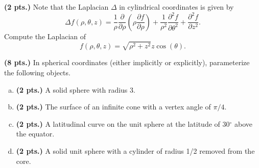 \documentclass[12pt]{article} %
\begin{document}
\vspace*{.5cm}

\begin{problem}
	\textbf{(2 pts.)} Note that the Laplacian $\Delta$ in cylindrical coordinates is given by
	\[
	\Delta f(\rho,\theta,z) = \frac{1}{\rho} \frac{\partial}{\partial \rho} \left(\rho \frac{\partial f}{\partial \rho}\right)+\frac{1}{\rho^2}\frac{\partial^2 f}{\partial \theta^2} + \frac{\partial^2 f}{\partial z^2}.
	\]
	Compute the Laplacian of
	\[
	f(\rho,\theta,z) = \sqrt{\rho^2+z^2} z \cos(\theta).
	\]
\end{problem}

\vspace*{0.5cm}

\begin{problem}
	\textbf{(8 pts.)} In spherical coordinates (either implicitly or explicitly), parameterize the following objects.
	\begin{enumerate}[(a)]
		\item \textbf{(2 pts.)} A solid sphere with radius 3.
		\item \textbf{(2 pts.)} The surface of an infinite cone with a vertex angle of $\pi/4$.
		\item \textbf{(2 pts.)} A latitudinal curve on the unit sphere at the latitude of 30$^\circ$ above the equator.
		\item \textbf{(2 pts.)} A solid unit sphere with a cylinder of radius 1/2 removed from the core.
	\end{enumerate}
\end{problem}

\vspace*{.5cm}
\end{document}
